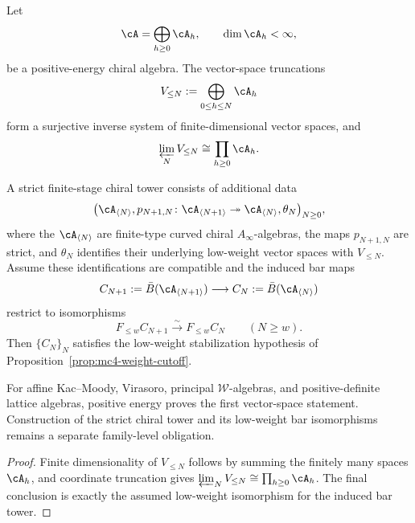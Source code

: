\begin{proposition}
\label{prop:standard-strong-filtration}
Let
\[
 \cA=\bigoplus_{h\geq0}\cA_h,
 \qquad \dim\cA_h<\infty ,
\]
be a positive-energy chiral algebra.  The vector-space truncations
\[
 V_{\leq N}:=\bigoplus_{0\leq h\leq N}\cA_h
\]
form a surjective inverse system of finite-dimensional vector spaces,
and
\[
 \varprojlim_N V_{\leq N}
 \cong\prod_{h\geq0}\cA_h .
\]

A strict finite-stage chiral tower consists of additional data
\[
 \bigl(\cA_{\langle N\rangle},
 p_{N+1,N}\colon\cA_{\langle N+1\rangle}
 \twoheadrightarrow\cA_{\langle N\rangle},
 \theta_N\bigr)_{N\geq0},
\]
where the \(\cA_{\langle N\rangle}\) are finite-type curved chiral
\(A_\infty\)-algebras, the maps \(p_{N+1,N}\) are strict, and
\(\theta_N\) identifies their underlying low-weight vector spaces
with \(V_{\leq N}\).  Assume these identifications are compatible and
the induced bar maps
\[
 C_{N+1}:=\bar B(\cA_{\langle N+1\rangle})
 \longrightarrow
 C_N:=\bar B(\cA_{\langle N\rangle})
\]
restrict to isomorphisms
\[
 F_{\leq w}C_{N+1}\xrightarrow{\sim}F_{\leq w}C_N
 \qquad (N\geq w).
\]
Then \(\{C_N\}_N\) satisfies the low-weight stabilization hypothesis
of Proposition~\ref{prop:mc4-weight-cutoff}.

For affine Kac--Moody, Virasoro, principal \(\mathcal W\)-algebras,
and positive-definite lattice algebras, positive energy proves the
first vector-space statement.  Construction of the strict chiral
tower and its low-weight bar isomorphisms remains a separate
family-level obligation.
\end{proposition}

\begin{proof}
Finite dimensionality of \(V_{\leq N}\) follows by summing the
finitely many spaces \(\cA_h\), and coordinate truncation gives
\(\varprojlim_NV_{\leq N}\cong\prod_{h\geq0}\cA_h\).
The final conclusion is exactly the assumed low-weight isomorphism
for the induced bar tower.
\end{proof}

